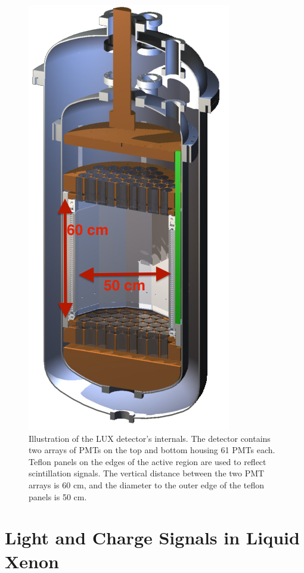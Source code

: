  \begin{figure}[h!]\centering
\includegraphics[scale=0.5]{Chapter_LUX_Det/LUX_half_rendering_white.jpg}
\caption{Illustration of the LUX detector's internals. The detector contains two arrays of PMTs on the top and bottom housing 61 PMTs each. Teflon panels on the edges of the active region are used to reflect scintillation signals. The vertical distance between the two PMT arrays is 60 cm, and the diameter to the outer edge of the teflon panels is 50 cm. }
\label{fig:LUX_TPC}
\end{figure}



\section{Light and Charge Signals in Liquid Xenon}

